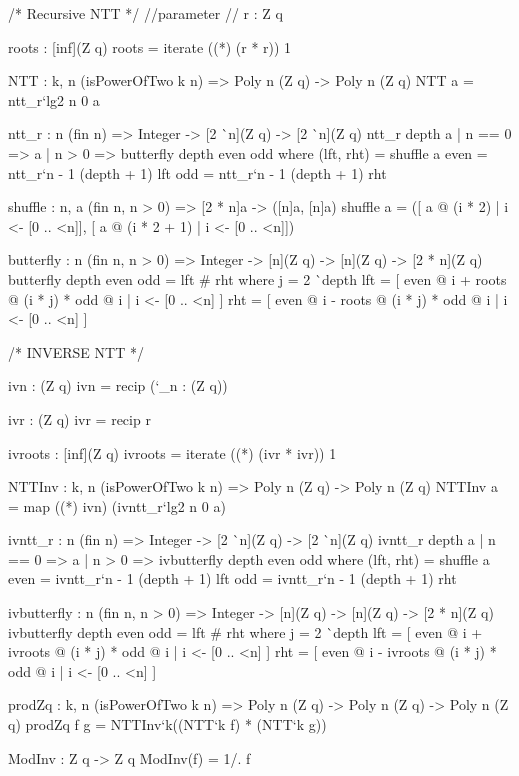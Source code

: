 \begin{code}
  /* Recursive NTT */
  //parameter
  //  r : Z q

  roots : [inf](Z q)
  roots = iterate ((*) (r * r)) 1

  NTT : {k, n} (isPowerOfTwo k n) => Poly n (Z q) -> Poly n (Z q)
  NTT a = ntt_r`{lg2 n} 0 a

  ntt_r : {n} (fin n) =>
    Integer -> [2 ^^ n](Z q) -> [2 ^^ n](Z q)
  ntt_r depth a
    | n == 0 => a
    | n > 0 => butterfly depth even odd
      where
        (lft, rht) = shuffle a
        even = ntt_r`{n - 1} (depth + 1) lft
        odd = ntt_r`{n - 1} (depth + 1) rht

  shuffle : {n, a} (fin n, n > 0) => [2 * n]a -> ([n]a, [n]a)
  shuffle a =
    ([ a @ (i * 2) | i <- [0 .. <n]], [ a @ (i * 2 + 1) | i <- [0 .. <n]])

  butterfly : {n} (fin n, n > 0) =>
    Integer -> [n](Z q) -> [n](Z q) -> [2 * n](Z q)
  butterfly depth even odd =
    lft # rht
    where
      j = 2 ^^ depth
      lft = [ even @ i + roots @ (i * j) * odd @ i | i <- [0 .. <n] ]
      rht = [ even @ i - roots @ (i * j) * odd @ i | i <- [0 .. <n] ]
\end{code}

\begin{code}
  /* INVERSE NTT */

  ivn : (Z q)
  ivn = recip (`_n : (Z q))

  ivr : (Z q)
  ivr = recip r

  ivroots : [inf](Z q)
  ivroots = iterate ((*) (ivr * ivr)) 1

  NTTInv : {k, n} (isPowerOfTwo k n) => Poly n (Z q) -> Poly n (Z q)
  NTTInv a =
    map ((*) ivn) (ivntt_r`{lg2 n} 0 a)

  ivntt_r : {n} (fin n) => Integer -> [2 ^^ n](Z q) -> [2 ^^ n](Z q)
  ivntt_r depth a
    | n == 0 => a
    | n > 0 => ivbutterfly depth even odd
      where
        (lft, rht) = shuffle a
        even = ivntt_r`{n - 1} (depth + 1) lft
        odd = ivntt_r`{n - 1} (depth + 1) rht

  ivbutterfly : {n} (fin n, n > 0) =>
    Integer -> [n](Z q) -> [n](Z q) -> [2 * n](Z q)
  ivbutterfly depth even odd =
    lft # rht
    where
      j = 2 ^^ depth
      lft = [ even @ i + ivroots @ (i * j) * odd @ i | i <- [0 .. <n] ]
      rht = [ even @ i - ivroots @ (i * j) * odd @ i | i <- [0 .. <n] ]
\end{code}

\begin{code}
  prodZq : {k, n} (isPowerOfTwo k n) =>
    Poly n (Z q) -> Poly n (Z q) -> Poly n (Z q)
  prodZq f g = NTTInv`{k}((NTT`{k} f) * (NTT`{k} g))

  ModInv : Z q -> Z q
  ModInv(f) =  1/. f
\end{code}

